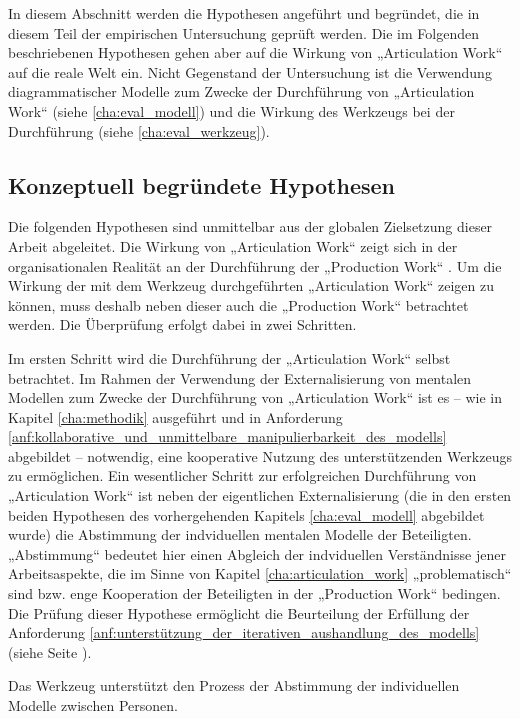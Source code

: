 In diesem Abschnitt werden die Hypothesen angeführt und begründet, die in diesem Teil der empirischen Untersuchung geprüft werden. Die im Folgenden beschriebenen Hypothesen gehen aber auf die Wirkung von „Articulation Work“ auf die reale Welt ein. Nicht Gegenstand der Untersuchung ist die Verwendung diagrammatischer Modelle zum Zwecke der Durchführung von „Articulation Work“ (siehe \ref{cha:eval_modell}) und die Wirkung des Werkzeugs bei der Durchführung (siehe \ref{cha:eval_werkzeug}).

\subsection{Konzeptuell begründete Hypothesen} %
\label{sub:a_konzeptionell_begründete_hypothesen}

Die folgenden Hypothesen sind unmittelbar aus der globalen Zielsetzung dieser Arbeit abgeleitet. Die Wirkung von „Articulation Work“ zeigt sich in der organisationalen Realität an der Durchführung der „Production Work“ \citet{Fujimura87}. Um die Wirkung der mit dem Werkzeug durchgeführten „Articulation Work“ zeigen zu können, muss deshalb neben dieser auch die „Production Work“ betrachtet werden. Die Überprüfung erfolgt dabei in zwei Schritten. 

Im ersten Schritt wird die Durchführung der „Articulation Work“ selbst betrachtet. Im Rahmen der Verwendung der Externalisierung von mentalen Modellen zum Zwecke der Durchführung von „Articulation Work“ ist es -- wie in Kapitel \ref{cha:methodik} ausgeführt und in Anforderung \ref{anf:kollaborative_und_unmittelbare_manipulierbarkeit_des_modells} abgebildet -- notwendig, eine kooperative Nutzung des unterstützenden Werkzeugs zu ermöglichen. Ein wesentlicher Schritt zur erfolgreichen Durchführung von „Articulation Work“ ist neben der eigentlichen Externalisierung (die in den ersten beiden Hypothesen des vorhergehenden Kapitels \ref{cha:eval_modell} abgebildet wurde) die Abstimmung der indviduellen mentalen Modelle der Beteiligten. „Abstimmung“ bedeutet hier einen Abgleich der indviduellen Verständnisse jener Arbeitsaspekte, die im Sinne von Kapitel \ref{cha:articulation_work} „problematisch“ sind bzw. enge Kooperation der Beteiligten in der „Production Work“ bedingen. Die Prüfung dieser Hypothese ermöglicht die Beurteilung der Erfüllung der Anforderung \ref{anf:unterstützung_der_iterativen_aushandlung_des_modells} (siehe Seite \pageref{anf:unterstützung_der_iterativen_aushandlung_des_modells}).

\begin{hyp}
	\label{hyp:abstimmung}
	Das Werkzeug unterstützt den Prozess der Abstimmung der individuellen Modelle zwischen Personen.
\end{hyp}

